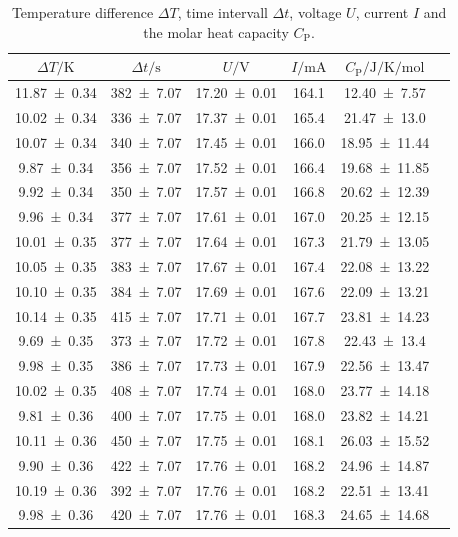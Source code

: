 \begin{table}[H]
	\centering
	\caption{Temperature difference $\Delta T$, time intervall $\Delta t$, voltage $U$, current $I$ and the molar heat capacity $C_{\text{P}}$.}
	\label{tab:heat_capacity1}
	\begin{tabular}{c c c c c c}
	\toprule
	$\Delta T / \unit{\kelvin}$ & $\Delta t / \unit{\second}$ & $U / \unit{\volt} $ & $I / \unit{\milli\ampere}$ & $C_{\text{P}} / \unit{\joule\per\kelvin\per\mol}$ \\
	\midrule
	\num{11.87+-0.34}& \num{382+-7.07}& \num{17.20+-0.01} & \num{164.1} & \num{12.40+-7.57} \\
	\num{10.02+-0.34}& \num{336+-7.07}& \num{17.37+-0.01} & \num{165.4} & \num{21.47+-13.0} \\
	\num{10.07+-0.34}& \num{340+-7.07}& \num{17.45+-0.01} & \num{166.0} & \num{18.95+-11.44} \\
	\num{9.87+-0.34}& \num{356+-7.07}& \num{17.52+-0.01} & \num{166.4} & \num{19.68+-11.85} \\
	\num{9.92+-0.34}& \num{350+-7.07}& \num{17.57+-0.01} & \num{166.8} & \num{20.62+-12.39} \\
	\num{9.96+-0.34}& \num{377+-7.07}& \num{17.61+-0.01} & \num{167.0} & \num{20.25+-12.15} \\
	\num{10.01+-0.35}& \num{377+-7.07}& \num{17.64+-0.01} & \num{167.3} & \num{21.79+-13.05} \\
	\num{10.05+-0.35}& \num{383+-7.07}& \num{17.67+-0.01} & \num{167.4} & \num{22.08+-13.22} \\
	\num{10.10+-0.35}& \num{384+-7.07}& \num{17.69+-0.01} & \num{167.6} & \num{22.09+-13.21} \\
	\num{10.14+-0.35}& \num{415+-7.07}& \num{17.71+-0.01} & \num{167.7} & \num{23.81+-14.23} \\
	\num{9.69+-0.35}& \num{373+-7.07}& \num{17.72+-0.01} & \num{167.8} & \num{22.43+-13.4} \\
	\num{9.98+-0.35}& \num{386+-7.07}& \num{17.73+-0.01} & \num{167.9} & \num{22.56+-13.47} \\
	\num{10.02+-0.35}& \num{408+-7.07}& \num{17.74+-0.01} & \num{168.0} & \num{23.77+-14.18} \\
	\num{9.81+-0.36}& \num{400+-7.07}& \num{17.75+-0.01} & \num{168.0} & \num{23.82+-14.21} \\
	\num{10.11+-0.36}& \num{450+-7.07}& \num{17.75+-0.01} & \num{168.1} & \num{26.03+-15.52} \\
	\num{9.90+-0.36}& \num{422+-7.07}& \num{17.76+-0.01} & \num{168.2} & \num{24.96+-14.87} \\
	\num{10.19+-0.36}& \num{392+-7.07}& \num{17.76+-0.01} & \num{168.2} & \num{22.51+-13.41} \\
	\num{9.98+-0.36}& \num{420+-7.07}& \num{17.76+-0.01} & \num{168.3} & \num{24.65+-14.68} \\
	\bottomrule
		\end{tabular}
\end{table}

